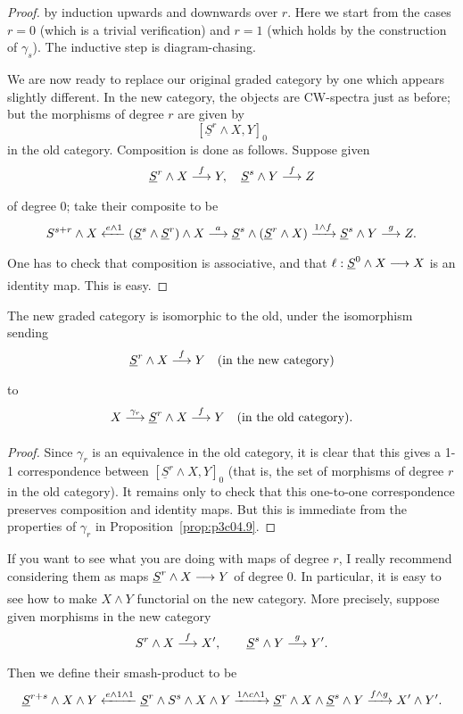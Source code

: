 \documentclass[../main]{subfiles}
\begin{document}
\begin{proof}
by induction upwards and downwards over $r$. Here we start from the cases $r = 0$ (which is a trivial verification) and $r = 1$ (which holds by the construction of $\gamma_s$). The inductive step is diagram-chasing.

We are now ready to replace our original graded category by one which appears slightly different. In the new category, the objects are CW-spectra just as before; but the morphisms of degree $r$ are given by \[[\underline S^r \wedge X, Y]_0\] in the old category. Composition is done as follows. Suppose given \[\underline S^r \wedge X \lar{f} Y, \quad \underline S^s \wedge Y \lar{f} Z\] of degree 0; take their composite to be \[S^{s + r} \wedge X \xleftarrow{e \wedge 1} (\underline S^s \wedge \underline S^r) \wedge X \lar{a} \underline S^s \wedge (\underline S^r \wedge X) \vra{1 \wedge f} \underline S^s \wedge Y \lar{g} Z.\] One has to check that composition is associative, and that $\ell : \underline S^0 \wedge X \lar{} X$ is an identity map. This is easy.
\end{proof}

\begin{proposition}\label{prop:p3ch04.10}
The new graded category is isomorphic to the old, under the isomorphism sending \[\underline S^r \wedge X \lar{f} Y \quad \text {(in the new category)}\] to \[X \lar{\gamma_r} \underline S^r \wedge X \lar{f} Y \quad \text{(in the old category).}\]
\end{proposition}

\begin{proof}
Since $\gamma_r$ is an equivalence in the old category, it is clear that this gives a 1-1 correspondence between $[\underline S^r \wedge X, Y]_0$ (that is, the set of morphisms of degree $r$ in the old category). It remains only to check that this one-to-one correspondence preserves composition and identity maps. But this is immediate from the properties of $\gamma_r$ in Proposition~\ref{prop:p3c04.9}.
\end{proof}

If you want to see what you are doing with maps of degree $r$, I really recommend considering them as maps $\underline S^r \wedge X \lar{} Y$ of degree $0$. In particular, it is easy to see how to make $X \wedge Y$ functorial on the new category. More precisely, suppose given morphisms in the new category \[S^r \wedge X \lar{f} X', \qquad \underline S^s \wedge Y \lar{g} Y'.\] Then we define their smash-product to be \[\underline S^{r + s} \wedge X \wedge Y \xleftarrow{e \wedge 1 \wedge 1} \underline S^r \wedge S^s \wedge X \wedge Y \lar{1 \wedge c \wedge 1} \underline S^r \wedge X \wedge \underline S^s \wedge Y \lar{f \wedge g} X' \wedge Y'.\]
\end{document}

